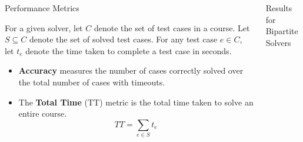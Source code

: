 \documentclass[final]{beamer}
\newlength{\sepwid}
\newlength{\onecolwid}
\begin{document}
\begin{columns}[t]
\begin{column}{\onecolwid}
\begin{block}{Performance Metrics}
      
      \noindent For a given solver, let $C$ denote the set of test cases in a course. Let $S\subseteq C$ denote the set of solved test cases. For any test case $e\in C$, let $t_e$ denote the time taken to complete a test case in seconds.
      
      \begin{itemize}
        \item \textbf{Accuracy} measures the number of cases correctly solved over the total number of cases with timeouts.
      
        \item  The \textbf{Total Time} (TT) metric is the total time taken to solve an entire course. 
          \[TT = \sum_{e\in S} t_e\]
          
          
      \end{itemize}



        
      \end{block}
      
    \end{column}
    

    
    \begin{column}{\onecolwid}
      
      
      
      \begin{block}{Results for Bipartite Solvers}
        


\end{block}
\end{column}
\end{columns}
\end{document}
